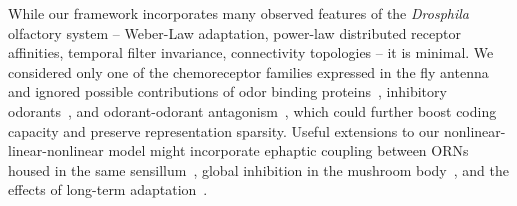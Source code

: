 \documentclass[9pt,lineno]{elife}
\begin{document}
While our framework incorporates many observed features of the \textit{Drosphila} olfactory system -- Weber-Law adaptation, power-law distributed receptor affinities, temporal filter invariance, connectivity topologies --  it is minimal. We considered only one of the chemoreceptor families expressed in the fly antenna~\citep{chemoreceptors_review} and ignored possible contributions of odor binding proteins~\citep{vogt1981pheromone,menuz2014rna}, inhibitory odorants~\citep{Cao_Tu_WL}, and odorant-odorant antagonism~\citep{reddy2017antagonism}, which could further boost coding capacity and preserve representation sparsity. %
Useful extensions to our nonlinear-linear-nonlinear model might incorporate ephaptic coupling between ORNs housed in the same sensillum~\citep{ephactic}, global inhibition in the mushroom body~\citep{giant_inhibitory_neuron}, and the effects of long-term adaptation~\citep{Guo_Smith}. 
\end{document}
